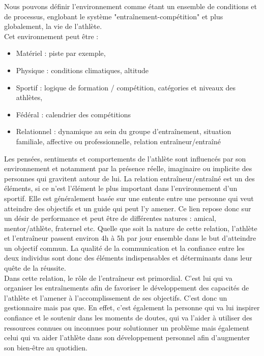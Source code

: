             Nous pouvons définir l’environnement comme étant un ensemble de conditions et de processus, englobant le système "entraînement-compétition" et plus globalement, la vie de l'athlète. \\
            
            Cet environnement peut être : 
            \begin{itemize}[label=\textbullet, font=\LARGE \color{blue}]
                \item Matériel : piste par exemple,
                \item Physique : conditions climatiques, altitude
                \item Sportif : logique de formation / compétition, catégories et niveaux des athlètes,
                \item Fédéral : calendrier des compétitions
                \item Relationnel : dynamique au sein du groupe d’entraînement, situation familiale, affective ou professionnelle, relation entraîneur/entraîné \\
            \end{itemize}

            Les pensées, sentiments et comportements de l'athlète sont influencés par son environnement et notamment par la présence réelle, imaginaire ou implicite des personnes qui gravitent autour de lui. La relation entraîneur/entraîné est un des éléments, si ce n'est l'élément le plus important dans l'environnement d'un sportif. Elle est généralement basée sur une entente entre une personne qui veut atteindre des objectifs et un guide qui peut l’y amener. Ce lien repose donc sur un désir de performance et peut être de différentes natures : amical, mentor/athlète, fraternel etc. Quelle que soit la nature de cette relation, l'athlète et l'entraîneur passent environ 4h à 5h par jour ensemble dans le but d'atteindre un objectif commun. La qualité de la communication et la confiance entre les deux individus sont donc des éléments indispensables et déterminants dans leur quête de la réussite.\\
            
            Dans cette relation, le rôle de l'entraîneur est primordial. C'est lui qui va organiser les entraînements afin de favoriser le développement des capacités de l'athlète et l'amener à l'accomplissement de ses objectifs. C'est donc un gestionnaire mais pas que. En effet, c'est également la personne qui va lui inspirer confiance et le soutenir dans les moments de doutes, qui va l'aider à utiliser des ressources connues ou inconnues pour solutionner un problème mais également celui qui va aider l'athlète dans son développement personnel afin d'augmenter son bien-être au quotidien.\\
         
